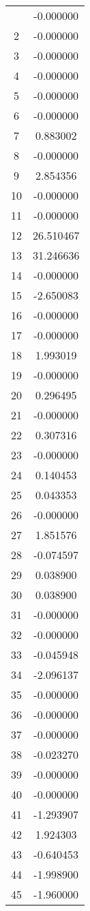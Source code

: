 \documentclass[12pt]{article}
\begin{document}
\begin{longtable}{@{}cc@{}}
\bottomrule
\endlastfoot
1 & -0.000000 \\
2 & -0.000000 \\
3 & -0.000000 \\
4 & -0.000000 \\
5 & -0.000000 \\
6 & -0.000000 \\
7 & 0.883002 \\
8 & -0.000000 \\
9 & 2.854356 \\
10 & -0.000000 \\
11 & -0.000000 \\
12 & 26.510467 \\
13 & 31.246636 \\
14 & -0.000000 \\
15 & -2.650083 \\
16 & -0.000000 \\
17 & -0.000000 \\
18 & 1.993019 \\
19 & -0.000000 \\
20 & 0.296495 \\
21 & -0.000000 \\
22 & 0.307316 \\
23 & -0.000000 \\
24 & 0.140453 \\
25 & 0.043353 \\
26 & -0.000000 \\
27 & 1.851576 \\
28 & -0.074597 \\
29 & 0.038900 \\
30 & 0.038900 \\
31 & -0.000000 \\
32 & -0.000000 \\
33 & -0.045948 \\
34 & -2.096137 \\
35 & -0.000000 \\
36 & -0.000000 \\
37 & -0.000000 \\
38 & -0.023270 \\
39 & -0.000000 \\
40 & -0.000000 \\
41 & -1.293907 \\
42 & 1.924303 \\
43 & -0.640453 \\
44 & -1.998900 \\
45 & -1.960000 \\

\end{longtable}
\end{document}
